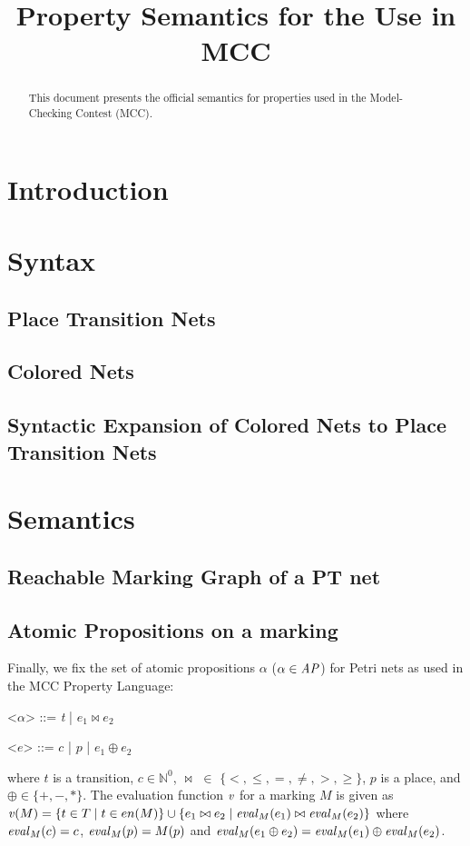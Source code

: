 \documentclass{article}
\title{Property Semantics for the Use in MCC}
\begin{document}
\maketitle


\begin{abstract}
This document presents the official semantics for properties used in the Model-Checking Contest (MCC).

\end{abstract}

\section{Introduction}


\section{Syntax}

\subsection{Place Transition Nets}

\subsection{Colored Nets}

\subsection{Syntactic Expansion of Colored Nets to Place Transition Nets}

\section{Semantics}

\subsection{Reachable Marking Graph of a PT net}

\subsection{Atomic Propositions on a marking}

Finally, we fix the set of atomic propositions $\alpha$ ($\alpha \in \mathit{AP}$) 
for Petri nets as used in the MCC Property Language:
\begin{grammar}
    \let\syntleft\relax
    \let\syntright\relax
    <$\alpha$> ::= \textit{t} |  $e_1 \bowtie e_2$

    <$e$> ::= $c$ | $p$ | $e_1 \oplus e_2$
\end{grammar}
where  $t$ is a transition, $c \in \mathbb{N}^0$, $\bowtie$ $\in$ $\{<, \leq, =, \neq, >, \geq\}$, $p$ is a place, and $\oplus \in \{ +, -, * \}$.
The evaluation function $\mathit{v}$ for a marking $M$ is given as
$\apeval(M) = \{ t \in T \mid t \in \en(M) \} \cup
\{ e_1 \bowtie e_2 \mid \eval[M][e_1] \bowtie \eval[M][e_2]\}$
where $\eval[M][c] = c$, $\eval[M][p] = M(p)$ and
$\eval[M][e_{1} \oplus e_{2}] = \eval[M][e_{1}] \oplus \eval[M][e_{2}]$.
\end{document}
